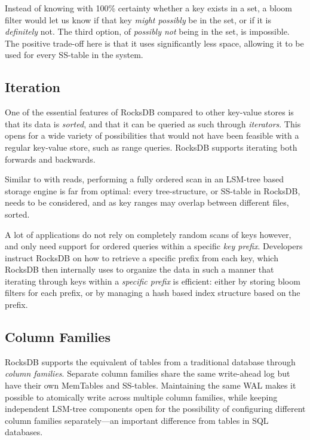 Instead of knowing with 100\% certainty whether a key exists in a set, a bloom
filter would let us know if that key \textit{might possibly} be in the set, or
if it is \textit{definitely} not. The third option, of \textit{possibly not}
being in the set, is impossible. The positive trade-off here is that it uses
significantly less space, allowing it to be used for every SS-table in the
system.

\subsection{Iteration}
One of the essential features of RocksDB compared to other key-value stores is
that its data is \textit{sorted}, and that it can be queried as such through
\textit{iterators}. This opens for a wide variety of possibilities that would
not have been feasible with a regular key-value store, such as range queries.
RocksDB supports iterating both forwards and backwards.

Similar to with reads, performing a fully ordered scan in an LSM-tree based
storage engine is far from optimal: every tree-structure, or SS-table in
RocksDB, needs to be considered, and as key ranges may overlap between different
files, sorted.

A lot of applications do not rely on completely random scans of keys however,
and only need support for ordered queries within a specific \textit{key prefix}.
Developers instruct RocksDB on how to retrieve a specific prefix from each key,
which RocksDB then internally uses to organize the data in such a manner that
iterating through keys within a \textit{specific prefix} is efficient: either by
storing bloom filters for each prefix, or by managing a hash based index
structure based on the prefix.


\subsection{Column Families}

RocksDB supports the equivalent of tables from a traditional database through
\textit{column
families}.
Separate column families share the same write-ahead log but have their own
MemTables and SS-tables. Maintaining the same WAL makes it possible to
atomically write across multiple column families, while keeping independent
LSM-tree components open for the possibility of configuring different column
families separately---an important difference from tables in SQL databases.

